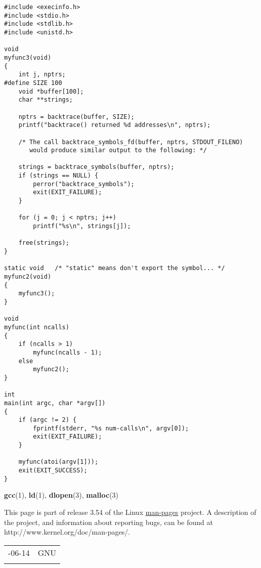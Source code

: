 \documentclass[]{article}
\let\realtextbf=\textbf
\renewcommand{\textbf}[1]{\textcolor{boldcolor}{\realtextbf{#1}}}
\renewcommand{\emph}[1]{\underline{#1}}
\begin{document}

\begin{verbatim}
#include <execinfo.h>
#include <stdio.h>
#include <stdlib.h>
#include <unistd.h>

void
myfunc3(void)
{
    int j, nptrs;
#define SIZE 100
    void *buffer[100];
    char **strings;

    nptrs = backtrace(buffer, SIZE);
    printf("backtrace() returned %d addresses\n", nptrs);

    /* The call backtrace_symbols_fd(buffer, nptrs, STDOUT_FILENO)
       would produce similar output to the following: */

    strings = backtrace_symbols(buffer, nptrs);
    if (strings == NULL) {
        perror("backtrace_symbols");
        exit(EXIT_FAILURE);
    }

    for (j = 0; j < nptrs; j++)
        printf("%s\n", strings[j]);

    free(strings);
}

static void   /* "static" means don't export the symbol... */
myfunc2(void)
{
    myfunc3();
}

void
myfunc(int ncalls)
{
    if (ncalls > 1)
        myfunc(ncalls - 1);
    else
        myfunc2();
}

int
main(int argc, char *argv[])
{
    if (argc != 2) {
        fprintf(stderr, "%s num-calls\n", argv[0]);
        exit(EXIT_FAILURE);
    }

    myfunc(atoi(argv[1]));
    exit(EXIT_SUCCESS);
}
\end{verbatim}


\textbf{gcc}(1), \textbf{ld}(1), \textbf{dlopen}(3), \textbf{malloc}(3)


This page is part of release 3.54 of the Linux \emph{man-pages} project.
A description of the project, and information about reporting bugs, can
be found at http://www.kernel.org/doc/man-pages/.

\begin{longtable}[c]{@{}ll@{}}
\toprule\addlinespace
2008-06-14 & GNU
\\\addlinespace
\bottomrule
\end{longtable}
\end{document}
